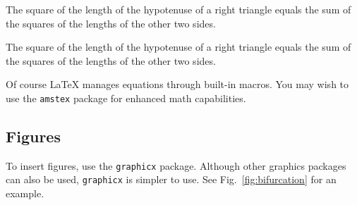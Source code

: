 \documentclass{ifacconf}
\begin{document}
\begin{thm}   %
The square of the length of the hypotenuse of a right triangle equals
the sum of the squares of the lengths of the other two sides.
\end{thm}

\begin{pf}    %
The square of the length of the hypotenuse of a right triangle equals the sum of the squares 
of the lengths of the other two sides.
\end{pf}


Of course LaTeX manages equations through built-in macros. You may
wish to use the \texttt{amstex} package for enhanced math
capabilities.

\subsection{Figures}

To insert figures, use the \texttt{graphicx} package. Although other
graphics packages can also be used, \texttt{graphicx} is simpler to
use. See  Fig.~\ref{fig:bifurcation} for an example.
\end{document}
